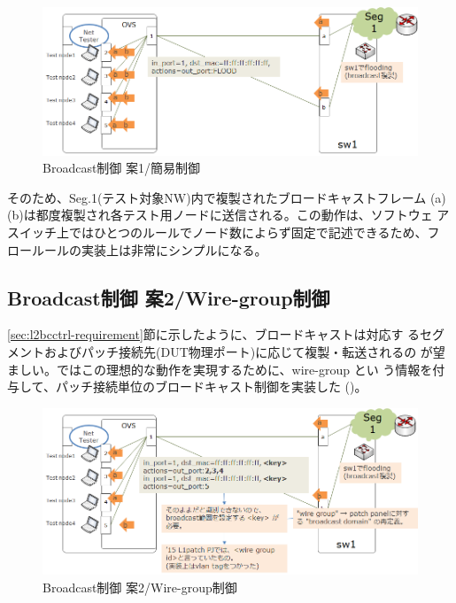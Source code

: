 \begin{figure}[h]
 \centering
 \includegraphics[scale=0.6]{img/l2bcctrl_plan1_design.png}
 \caption{Broadcast制御 案1/簡易制御}
 \label{fig:l2bcctrl_plan1_design}
\end{figure}

そのため、Seg.1(テスト対象NW)内で複製されたブロードキャストフレーム
(a)(b)は都度複製され各テスト用ノードに送信される。この動作は、ソフトウェ
アスイッチ上ではひとつのルールでノード数によらず固定で記述できるため、フ
ロールールの実装上は非常にシンプルになる。

  \subsection{Broadcast制御 案2/Wire-group制御}
  \label{sec:l2bcctrl-plan2}

\ref{sec:l2bcctrl-requirement}節に示したように、ブロードキャストは対応す
るセグメントおよびパッチ接続先(DUT物理ポート)に応じて複製・転送されるの
が望ましい。\lopjc ではこの理想的な動作を実現するために、wire-group とい
う情報を付与して、パッチ接続単位のブロードキャスト制御を実装した
()。

\begin{figure}[h]
 \centering
 \includegraphics[scale=0.6]{img/l2bcctrl_plan2_design.png}
 \caption{Broadcast制御 案2/Wire-group制御}
 \label{fig:l2bcctrl_plan2_design}
\end{figure}

